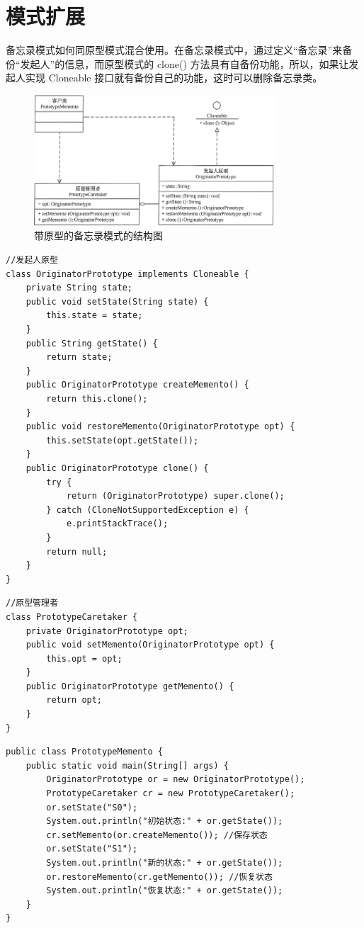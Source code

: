\section{模式扩展}
备忘录模式如何同原型模式混合使用。在备忘录模式中，通过定义“备忘录”来备份“发起人”的信息，而原型模式的 clone() 方法具有自备份功能，所以，如果让发起人实现 Cloneable 接口就有备份自己的功能，这时可以删除备忘录类。
\begin{figure}[!h]
	\centering
	\includegraphics[width=0.8\textwidth]{image/18-4}
	\caption{带原型的备忘录模式的结构图}
\end{figure}
\begin{lstlisting}
//发起人原型
class OriginatorPrototype implements Cloneable {
	private String state;
	public void setState(String state) {
		this.state = state;
	}
	public String getState() {
		return state;
	}
	public OriginatorPrototype createMemento() {
		return this.clone();
	}
	public void restoreMemento(OriginatorPrototype opt) {
		this.setState(opt.getState());
	}
	public OriginatorPrototype clone() {
		try {
			return (OriginatorPrototype) super.clone();
		} catch (CloneNotSupportedException e) {
			e.printStackTrace();
		}
		return null;
	}
}
\end{lstlisting}
\begin{lstlisting}
//原型管理者
class PrototypeCaretaker {
	private OriginatorPrototype opt;
	public void setMemento(OriginatorPrototype opt) {
		this.opt = opt;
	}
	public OriginatorPrototype getMemento() {
		return opt;
	}
}
\end{lstlisting}
\begin{lstlisting}
public class PrototypeMemento {
	public static void main(String[] args) {
		OriginatorPrototype or = new OriginatorPrototype();
		PrototypeCaretaker cr = new PrototypeCaretaker();
		or.setState("S0");
		System.out.println("初始状态:" + or.getState());
		cr.setMemento(or.createMemento()); //保存状态
		or.setState("S1");
		System.out.println("新的状态:" + or.getState());
		or.restoreMemento(cr.getMemento()); //恢复状态
		System.out.println("恢复状态:" + or.getState());
	}
}
\end{lstlisting}
